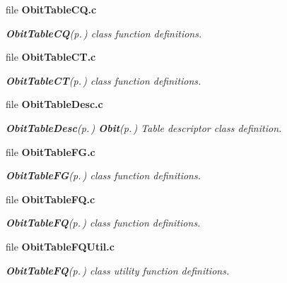 \begin{CompactItemize}
\item 
file {\bf Obit\-Table\-CQ.c}
\begin{CompactList}\small\item\em {\bf Obit\-Table\-CQ}{\rm (p.\,\pageref{structObitTableCQ})} class function definitions. \item\end{CompactList}

\item 
file {\bf Obit\-Table\-CT.c}
\begin{CompactList}\small\item\em {\bf Obit\-Table\-CT}{\rm (p.\,\pageref{structObitTableCT})} class function definitions. \item\end{CompactList}

\item 
file {\bf Obit\-Table\-Desc.c}
\begin{CompactList}\small\item\em {\bf Obit\-Table\-Desc}{\rm (p.\,\pageref{structObitTableDesc})} {\bf Obit}{\rm (p.\,\pageref{structObit})} Table descriptor class definition. \item\end{CompactList}

\item 
file {\bf Obit\-Table\-FG.c}
\begin{CompactList}\small\item\em {\bf Obit\-Table\-FG}{\rm (p.\,\pageref{structObitTableFG})} class function definitions. \item\end{CompactList}

\item 
file {\bf Obit\-Table\-FQ.c}
\begin{CompactList}\small\item\em {\bf Obit\-Table\-FQ}{\rm (p.\,\pageref{structObitTableFQ})} class function definitions. \item\end{CompactList}

\item 
file {\bf Obit\-Table\-FQUtil.c}
\begin{CompactList}\small\item\em {\bf Obit\-Table\-FQ}{\rm (p.\,\pageref{structObitTableFQ})} class utility function definitions. \item\end{CompactList}


\end{CompactItemize}
